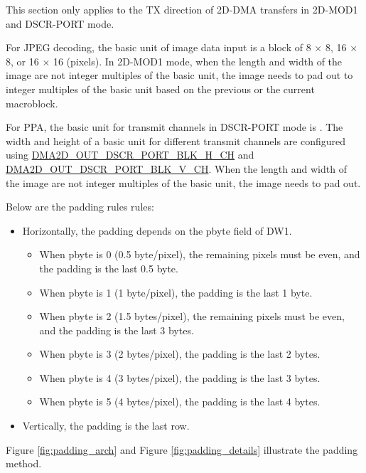 \documentclass[main\_\_EN.tex]{subfiles}
\begin{document}
This section only applies to the TX direction of 2D-DMA transfers in 2D-MOD1 and DSCR-PORT mode.

For JPEG decoding, the basic unit of image data input is a block of 8 $\times$ 8, 16 $\times$ 8, or 16 $\times$ 16 (pixels). In 2D-MOD1 mode, when the length and width of the image are not integer multiples of the basic unit, the image needs to pad out to integer multiples of the basic unit based on the previous or the current macroblock.

For PPA, the basic unit for transmit channels in DSCR-PORT mode is . The width and height of a basic unit for different transmit channels are configured using \hyperref[fielddesc:DMA2DOUTDSCRPORTBLKHCHN]{DMA2D\_OUT\_DSCR\_PORT\_BLK\_H\_CH} and \hyperref[fielddesc:DMA2DOUTDSCRPORTBLKVCHN]{DMA2D\_OUT\_DSCR\_PORT\_BLK\_V\_CH}. When the length and width of the image are not integer multiples of the basic unit, the image needs to pad out.

Below are the padding rules rules:
\begin{itemize}
    \item Horizontally, the padding depends on the pbyte field of DW1.
        \begin{itemize}
            \item When pbyte is 0 (0.5 byte/pixel), the remaining pixels must be even, and the padding is the last 0.5 byte.
            \item When pbyte is 1 (1 byte/pixel), the padding is the last 1 byte.
            \item When pbyte is 2 (1.5 bytes/pixel), the remaining pixels must be even, and the padding is the last 3 bytes.
            \item When pbyte is 3 (2 bytes/pixel), the padding is the last 2 bytes.
            \item When pbyte is 4 (3 bytes/pixel), the padding is the last 3 bytes.
            \item When pbyte is 5 (4 bytes/pixel), the padding is the last 4 bytes.
        \end{itemize}
    \item Vertically, the padding is the last row.
\end{itemize}

Figure \ref{fig:padding_arch} and Figure \ref{fig:padding_details} illustrate the padding method.
\end{document}
